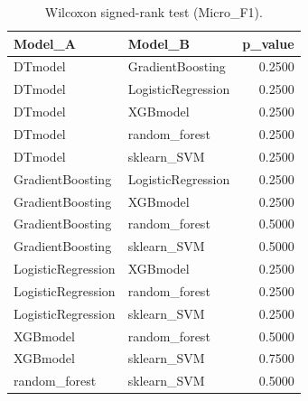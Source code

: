 \begin{table}[t]
\centering
\begin{tabular}{llr}
\toprule
Model_A & Model_B & p_value \\
\midrule
DTmodel & GradientBoosting & 0.2500 \\
DTmodel & LogisticRegression & 0.2500 \\
DTmodel & XGBmodel & 0.2500 \\
DTmodel & random_forest & 0.2500 \\
DTmodel & sklearn_SVM & 0.2500 \\
GradientBoosting & LogisticRegression & 0.2500 \\
GradientBoosting & XGBmodel & 0.2500 \\
GradientBoosting & random_forest & 0.5000 \\
GradientBoosting & sklearn_SVM & 0.5000 \\
LogisticRegression & XGBmodel & 0.2500 \\
LogisticRegression & random_forest & 0.2500 \\
LogisticRegression & sklearn_SVM & 0.2500 \\
XGBmodel & random_forest & 0.5000 \\
XGBmodel & sklearn_SVM & 0.7500 \\
random_forest & sklearn_SVM & 0.5000 \\
\bottomrule
\end{tabular}
\caption{Wilcoxon signed-rank test (Micro_F1).}
\label{tab:wilcoxon_Micro_F1}
\end{table}
